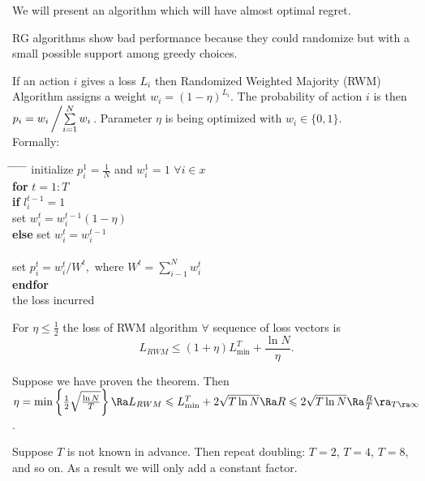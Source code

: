 
We will present an algorithm which will have almost optimal regret.

RG algorithms show bad performance because they could randomize but with a small possible support among greedy choices.
\begin{definition}
If an action $i$ gives a loss $L_i$ then Randomized Weighted Majority (RWM) Algorithm assigns a weight $w_i=(1-\eta)^{L_i}$. The probability of action $i$ is then $p_i=w_i\left/\sum\limits_{i=1}^Nw_i\right.$. Parameter $\eta$ is being optimized with $w_i\in\{0,1\}$.\\  
Formally:
\begin{tabbing}
\hspace*{.25in} \= \hspace*{.25in} \= \hspace*{.25in} \= \hspace*{.25in} \= \hspace*{.25in} \=\kill
\> initialize $p^1_i=\frac{1}{N}$ and $w^1_i=1$ $\forall i\in x$\\
\> {\bf for} $t=1:T$\\
\>\> {\bf if} $l^{t-1}_i=1$\\
\>\>\> set $w^t_i=w^{t-1}_i(1-\eta)$\\
\>\> {\bf else} set $w^t_i=w^{t-1}_i$\\
\> \\
\>\> set $p^t_i=w^t_i/W^t,$ where $W^t=\sum\limits_{i-1}^Nw^t_i$\\
\> {\bf endfor}\\
 the loss incurred
\end{tabbing}
\end{definition}
\begin{theorem}
For $\eta\leqslant\frac{1}{2}$ the loss of RWM algorithm $\forall$ sequence of loss vectors is
$$
L_{RWM}\leqslant(1+\eta)L^T_{\min}+\frac{\ln N}{\eta}.
$$
\end{theorem}
\begin{remark}
Suppose we have proven the theorem. Then $\eta=\min\left\{\frac{1}{2}\sqrt{\frac{\ln N}{T}}\right\}\Ra L_{RWM}\leqslant L^T_{\min}+2\sqrt{T\ln N}\Ra R\leqslant 2\sqrt{T\ln N}\Ra\frac{R}{T}\ra_{T\ra\infty}$.
\end{remark} 
\begin{remark}
Suppose $T$ is not known in advance. Then repeat doubling: $T=2$, $T=4$, $T=8$, and so on. As a result we will only add a constant factor.
\end{remark}
